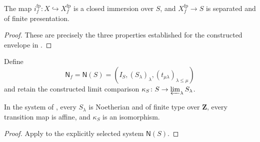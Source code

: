 \begin{lemma}

  \label{lemma:nagata-final-fp-envelope}

  The map $i_f^{\mathrm{fp}}\colon X\hookrightarrow X_f^{\mathrm{fp}}$ is a
  closed immersion over $S$, and
  $X_f^{\mathrm{fp}}\to S$ is separated and of finite presentation.
\end{lemma}

\begin{proof}
  These are precisely the three properties established for the constructed
  envelope in .
\end{proof}

\begin{definition}
  \label{def:nagata-final-noetherian-base-system}

  Define
  \[
    \mathsf N_f=\mathsf N(S)
      =(I_S,(S_\lambda)_\lambda,(t_{\mu\lambda})_{\lambda\leq\mu})
  \]
  and retain the constructed limit comparison
  $\kappa_S\colon S\to\varprojlim_\lambda S_\lambda$.
\end{definition}

\begin{lemma}
  \label{lemma:nagata-final-noetherian-base-system}

  In the system of
  , every $S_\lambda$ is
  Noetherian and of finite type over $\mathbf Z$, every transition map is
  affine, and $\kappa_S$ is an isomorphism.
\end{lemma}

\begin{proof}
  Apply  to the explicitly
  selected system $\mathsf N(S)$.
\end{proof}

